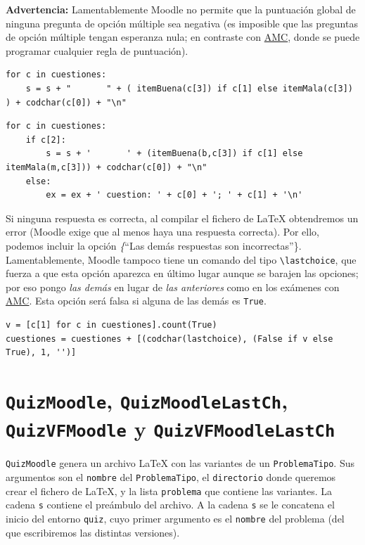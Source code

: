\documentclass[10pt,a4paper]{report}
\begin{document}
\textbf{Advertencia:} Lamentablemente Moodle no permite que la
puntuación global de ninguna pregunta de opción múltiple sea negativa
(es imposible que las preguntas de opción múltiple tengan esperanza
nula; en contraste con
\href{https://www.auto-multiple-choice.net/}{AMC}, donde se puede
programar cualquier regla de puntuación).

\begin{verbatim}
for c in cuestiones:
    s = s + "       " + ( itemBuena(c[3]) if c[1] else itemMala(c[3]) ) + codchar(c[0]) + "\n"
\end{verbatim}

\begin{verbatim}
for c in cuestiones:
    if c[2]:
        s = s + '       ' + (itemBuena(b,c[3]) if c[1] else itemMala(m,c[3])) + codchar(c[0]) + "\n"
    else:
        ex = ex + ' cuestion: ' + c[0] + '; ' + c[1] + '\n'
\end{verbatim}

Si ninguna respuesta es correcta, al compilar el fichero de \LaTeX{}
obtendremos un error (Moodle exige que al menos haya una respuesta
correcta). Por ello, podemos incluir la opción \emph\{``Las demás
  respuestas son incorrectas''\}. Lamentablemente, Moodle tampoco tiene
un comando del tipo \texttt{\textbackslash{}lastchoice}, que fuerza a que esta opción
aparezca en último lugar aunque se barajen las opciones; por eso pongo
\emph{las demás} en lugar de \emph{las anteriores} como en los exámenes
con \href{https://www.auto-multiple-choice.net/}{AMC}. Esta opción
será falsa si alguna de las demás es \texttt{True}.

\label{cuestion alternativa por defecto para Moodle}
\begin{verbatim}
v = [c[1] for c in cuestiones].count(True)
cuestiones = cuestiones + [(codchar(lastchoice), (False if v else True), 1, '')]
\end{verbatim}
\section{\texttt{QuizMoodle}, \texttt{QuizMoodleLastCh}, \texttt{QuizVFMoodle} y \texttt{QuizVFMoodleLastCh}}
\label{sec:org63747e6}

\texttt{QuizMoodle} genera un archivo \LaTeX{} con las variantes de un \texttt{ProblemaTipo}.
Sus argumentos son el \texttt{nombre} del \texttt{ProblemaTipo}, el \texttt{directorio} donde queremos crear el fichero de \LaTeX{}, y la lista \texttt{problema} que contiene las variantes.
La cadena \texttt{s} contiene el preámbulo del archivo.
A la cadena \texttt{s} se le concatena el inicio del entorno \texttt{quiz}, cuyo primer argumento es el \texttt{nombre} del problema (del que escribiremos las distintas versiones).
\end{document}
